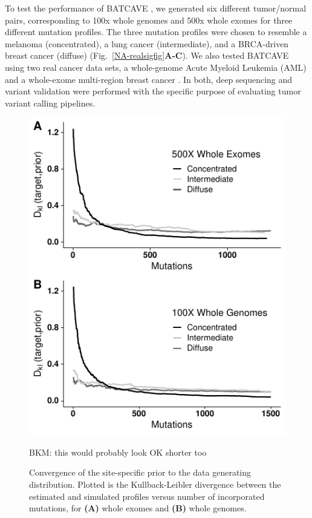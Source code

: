 \documentclass[a4,center,fleqn]{NAR}
\newcommand{\bkmcomment}[1]{{\color{blue}BKM: #1}}
\newcommand{\batcave}{BATCAVE }
\begin{document}
To test the performance of \batcave, we generated six different tumor/normal pairs, corresponding to 100x whole genomes and 500x whole exomes for three different mutation profiles.
The three mutation profiles were chosen to resemble a melanoma (concentrated), a lung cancer (intermediate), and a BRCA-driven breast cancer (diffuse) (Fig.~\ref{NA-realsigfig}\textbf{A-C}).
We also tested \batcave using two real cancer data sets, a whole-genome Acute Myeloid Leukemia (AML) \citep{Griffith2015} and a whole-exome multi-region breast cancer \cite{Shi2018}.
In both, deep sequencing and variant validation were performed with the specific purpose of evaluating tumor variant calling pipelines.

\begin{figure}
  \begin{center}
  \includegraphics{figures/kl_only.pdf}
  \end{center}
  \bkmcomment{this would probably look OK shorter too}
  \caption{Convergence of the site-specific prior to the data generating distribution. Plotted is the Kullback-Leibler divergence between the estimated and simulated profiles versus number of incorporated mutations, for \textbf{(A)} whole exomes and \textbf{(B)} whole genomes.
  }
\label{NAR-kl_fig}
\end{figure}
\end{document}
